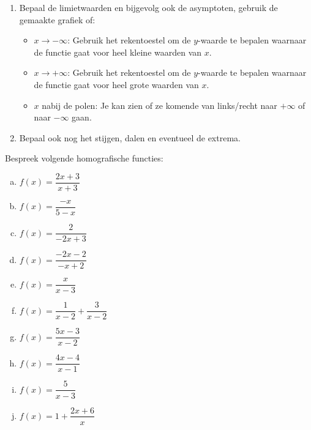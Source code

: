 \documentclass[12pt]{article}
\begin{document}
\begin{theorie}
\begin{enumerate}
  \item Bepaal de limietwaarden en bijgevolg ook de asymptoten, gebruik de gemaakte grafiek of:
  \begin{itemize}
  \scriptsize
    \item $x\to-\infty$: Gebruik het rekentoestel om de $y$-waarde te bepalen waarnaar de functie gaat voor heel kleine waarden van $x$.
    \item $x\to+\infty$: Gebruik het rekentoestel om de $y$-waarde te bepalen waarnaar de functie gaat voor heel grote waarden van $x$.
    \item $x$ nabij de polen: Je kan zien of ze komende van links/recht naar $+\infty$ of naar $-\infty$ gaan.
  \end{itemize}
  \item Bepaal ook nog het stijgen, dalen en eventueel de extrema.
\end{enumerate}

\end{theorie}

\begin{oefening}
Bespreek volgende homografische functies:
\begin{multicols}{2}
\begin{enumerate}[(a)]
  \itemsep1em
  \item $f(x)=\dfrac{2x+3}{x+3}$
  \item $f(x)=\dfrac{-x}{5-x}$
  \item $f(x)=\dfrac{2}{-2x+3}$
  \item $f(x)=\dfrac{-2x-2}{-x+2}$
  \item $f(x)=\dfrac{x}{x-3}$
  \item $f(x)=\dfrac{1}{x-2}+\dfrac{3}{x-2}$
  \item $f(x)=\dfrac{5x-3}{x-2}$
  \item $f(x)=\dfrac{4x-4}{x-1}$
  \item $f(x)=\dfrac{5}{x-3}$
  \item $f(x)=1+\dfrac{2x+6}{x}$
\end{enumerate}
\end{multicols}
\end{oefening}
\end{document}
